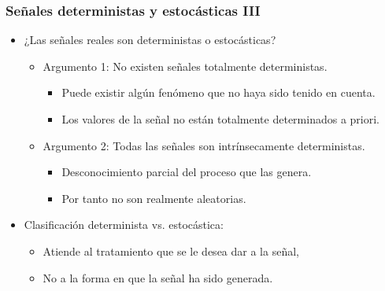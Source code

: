 \begin{frame}\frametitle{Señales deterministas y estocásticas III}
    \begin{itemize}
        \item ¿Las señales reales son deterministas o estocásticas?
        \vspace{0.1cm}
        \begin{itemize}\footnotesize
            \item \alert{Argumento 1:} No existen señales totalmente deterministas.
            \begin{itemize}\scriptsize
                \item Puede existir algún fenómeno que no haya sido tenido en cuenta.
                \item Los valores de la señal no están totalmente determinados a priori.
            \end{itemize}
            \item \alert{Argumento 2:} Todas las señales son intrínsecamente deterministas.
            \begin{itemize}\scriptsize
                \item Desconocimiento parcial del proceso que las genera. 
                \item Por tanto no son realmente aleatorias.
            \end{itemize}
        \end{itemize}
        \vspace{0.1cm}
        \item Clasificación \alert{determinista} vs. \alert{estocástica}:
        \vspace{0.1cm}
        \begin{itemize}\footnotesize
            \item Atiende al tratamiento que se le desea dar a la señal,
            \vspace{0.1cm}
            \item No a la forma en que la señal ha sido generada.
        \end{itemize}
    \end{itemize}
\end{frame}